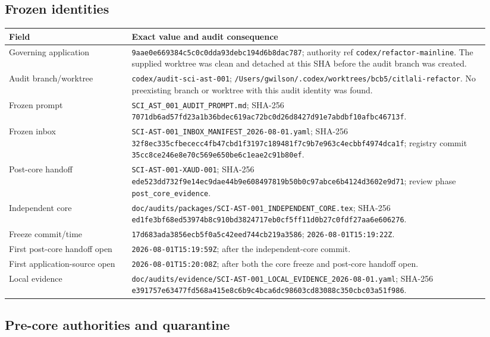 \documentclass[11pt]{article}
\newcommand{\code}[1]{\nolinkurl{#1}}
\newcommand{\status}[1]{\nolinkurl{#1}}
\begin{document}
\subsection{Frozen identities}

\begin{longtable}{L{0.24\linewidth}L{0.70\linewidth}}
\toprule
Field & Exact value and audit consequence \\
\midrule
\endhead
Governing application &
\code{9aae0e669384c5c0c0dda93debc194d6b8dac787}; authority ref
\code{codex/refactor-mainline}.  The supplied worktree was clean and detached
at this SHA before the audit branch was created. \\
Audit branch/worktree &
\code{codex/audit-sci-ast-001};
\code{/Users/gwilson/.codex/worktrees/bcb5/citlali-refactor}.  No preexisting
branch or worktree with this audit identity was found. \\
Frozen prompt &
\code{SCI_AST_001_AUDIT_PROMPT.md}; SHA-256
\code{7071db6ad57fd23a1b36bdec619ac72bc0d26d8427d91e7abdbf10afbc46713f}. \\
Frozen inbox &
\code{SCI-AST-001_INBOX_MANIFEST_2026-08-01.yaml}; SHA-256
\code{32f8ec335cfbececc4fb47cbd1f3197c189481f7c9b7e963c4ecbbf4974dca1f};
registry commit \code{35cc8ce246e8e70c569e650be6c1eae2c91b80ef}. \\
Post-core handoff &
\code{SCI-AST-001-XAUD-001}; SHA-256
\code{ede523dd732f9e14ec9dae44b9e608497819b50b0c97abce6b4124d3602e9d71};
review phase \status{post_core_evidence}. \\
Independent core &
\code{doc/audits/packages/SCI-AST-001_INDEPENDENT_CORE.tex}; SHA-256
\code{ed1fe3bf68ed53974b8c910bd3824717eb0cf5ff11d0b27c0fdf27aa6e606276}. \\
Freeze commit/time &
\code{17d683ada3856ecb5f0a5c42eed744cb219a3586};
\code{2026-08-01T15:19:22Z}. \\
First post-core handoff open &
\code{2026-08-01T15:19:59Z}; after the independent-core commit. \\
First application-source open &
\code{2026-08-01T15:20:08Z}; after both the core freeze and post-core handoff open. \\
Local evidence &
\code{doc/audits/evidence/SCI-AST-001_LOCAL_EVIDENCE_2026-08-01.yaml};
SHA-256
\code{e391757e63477fd568a415e8c6b9c4bca6dc98603cd83088c350cbc03a51f986}. \\
\bottomrule
\end{longtable}

\subsection{Pre-core authorities and quarantine}
\end{document}
